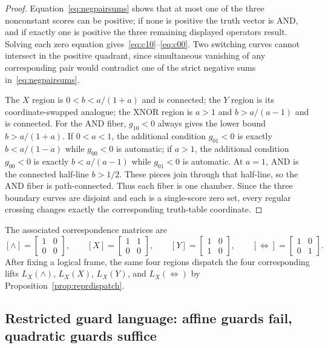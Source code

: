 \documentclass[11pt]{article}
\theoremstyle{definition}
\theoremstyle{remark}
\begin{document}
\begin{proof}
Equation~\eqref{eq:negpairsums} shows that at most one of the three nonconstant scores can be positive; if none is positive the truth vector is AND, and if exactly one is positive the three remaining displayed operators result. Solving each zero equation gives~\eqref{eq:c10}--\eqref{eq:c00}. Two switching curves cannot intersect in the positive quadrant, since simultaneous vanishing of any corresponding pair would contradict one of the strict negative sums in~\eqref{eq:negpairsums}.

The $X$ region is $0<b<a/(1+a)$ and is connected; the $Y$ region is its coordinate-swapped analogue; the XNOR region is $a>1$ and $b>a/(a-1)$ and is connected. For the AND fiber, $g_{10}<0$ always gives the lower bound $b>a/(1+a)$. If $0<a<1$, the additional condition $g_{01}<0$ is exactly $b<a/(1-a)$ while $g_{00}<0$ is automatic; if $a>1$, the additional condition $g_{00}<0$ is exactly $b<a/(a-1)$ while $g_{01}<0$ is automatic. At $a=1$, AND is the connected half-line $b>1/2$. These pieces join through that half-line, so the AND fiber is path-connected. Thus each fiber is one chamber. Since the three boundary curves are disjoint and each is a single-score zero set, every regular crossing changes exactly the corresponding truth-table coordinate.
\end{proof}

The associated correspondence matrices are
\[
 [\land]=\begin{bmatrix}1&0\\0&0\end{bmatrix},\qquad
 [X]=\begin{bmatrix}1&1\\0&0\end{bmatrix},\qquad
 [Y]=\begin{bmatrix}1&0\\1&0\end{bmatrix},\qquad
 [\Leftrightarrow]=\begin{bmatrix}1&0\\0&1\end{bmatrix}.
\]
After fixing a logical frame, the same four regions dispatch the four corresponding lifts
$L_X(\land)$, $L_X(X)$, $L_X(Y)$, and $L_X(\Leftrightarrow)$ by Proposition~\ref{prop:reprdispatch}.

\subsection{Restricted guard language: affine guards fail, quadratic guards suffice}
\end{document}
